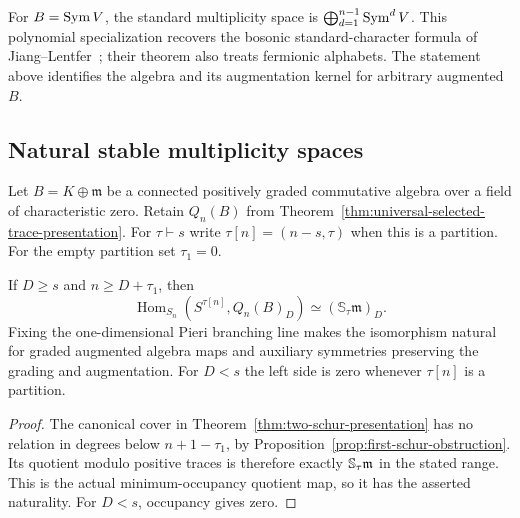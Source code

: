 For $B=\operatorname{Sym} V$, the standard multiplicity space is
$\bigoplus_{d=1}^{n-1}\operatorname{Sym}^dV$. This polynomial specialization
recovers the bosonic standard-character formula of
Jiang--Lentfer~\cite[Proposition 6.5 and Theorem 6.6]{JiangLentfer2026};
their theorem also treats fermionic alphabets. The statement above
identifies the algebra and its augmentation kernel for arbitrary
augmented $B$.



\subsection{Natural stable multiplicity spaces}
\label{sec:stable-specht-multiplicities}

Let $B=K\oplus\mathfrak m$ be a connected positively graded
commutative algebra over a field of characteristic zero. Retain $Q_n(B)$ from
Theorem~\ref{thm:universal-selected-trace-presentation}.
For $\tau\vdash s$ write $\tau[n]=(n-s,\tau)$ when this is a partition.
For the empty partition set $\tau_1=0$.

\begin{samepage}
\begin{theorem}
\label{thm:stable-augmented-multiplicities}
If $D\ge s$ and $n\ge D+\tau_1$, then
\[
 \operatorname{Hom}_{S_n}(S^{\tau[n]},Q_n(B)_D)
 \simeq (\mathbb S_\tau\mathfrak m)_D.
\]
Fixing the one-dimensional Pieri branching line makes the
isomorphism natural for graded augmented algebra maps and
auxiliary symmetries preserving the grading and augmentation.
For $D<s$ the left side is zero whenever $\tau[n]$ is a partition.
\end{theorem}
\end{samepage}
\begin{proof}
The canonical cover in Theorem~\ref{thm:two-schur-presentation} has
no relation in degrees below $n+1-\tau_1$, by
Proposition~\ref{prop:first-schur-obstruction}. Its quotient modulo
positive traces is therefore exactly $\mathbb S_\tau\mathfrak m$ in
the stated range. This is the actual minimum-occupancy quotient map,
so it has the asserted naturality. For $D<s$, occupancy gives zero.
\end{proof}

